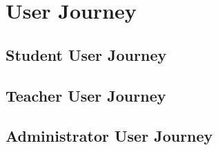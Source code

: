 \section{User Journey}





\subsection{Student User Journey}



\subsection{Teacher User Journey}



\subsection{Administrator User Journey}



